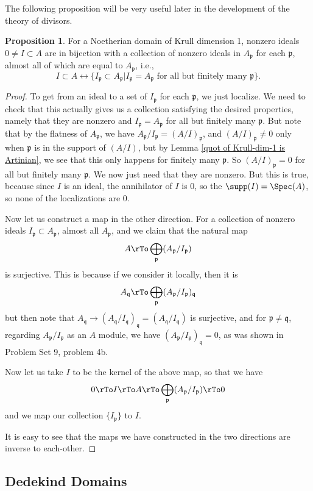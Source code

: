 \documentclass[12 pt]{article}
\theoremstyle{definition}
\newtheorem{propn}[thm]{Proposition}
\renewcommand{\(}{\left(}
\renewcommand{\)}{\right)}
\newcommand\fp{{\mathfrak p}}
\newcommand\fq{{\mathfrak q}}
\begin{document}
The following proposition will be very useful later in the development of the theory of divisors.

\begin{propn} For a Noetherian domain of Krull dimension 1, nonzero ideals $0 \neq I \subset A$ are in bijection with a collection of nonzero ideals in $A_{\fp}$ for each $\fp$, almost all of which are equal to $A_{\fp}$, i.e.,
\[I \subset A \longleftrightarrow \{I_{\fp} \subset A_{\fp} | I_{\fp} =A_{\fp} \text{ for all but finitely many $\fp$}\}.\]
\label{I correspond to I_p}
\end{propn}
\begin{proof} To get from an ideal to a set of $I_{\fp}$ for each $\fp$, we just localize. We need to check that this actually gives us a collection satisfying the desired properties, namely that they are nonzero and $I_{\fp}=A_{\fp}$ for all but finitely many $\fp$. But note that by the flatness of $A_{\fp}$, we have $A_{\fp}/I_{\fp}=(A/I)_{\fp}$, and $(A/I)_{\fp} \neq 0$ only when $\fp$ is in the support of $(A/I)$, but by Lemma \ref{quot of Krull-dim-1 is Artinian}, we see that this only happens for finitely many $\fp$. So $(A/I)_{\fp} =0 $ for all but finitely many $\fp$. We now just need that they are nonzero. But this is true, because since $I$ is an ideal, the annihilator of $I$ is 0, so the $\supp(I)=\Spec(A)$, so none of the localizations are 0.

Now let us construct a map in the other direction. For a collection  of nonzero ideals $I_{\fp} \subset A_{\fp}$, almost all $A_{\fp}$, and we claim that the natural map
\[A \rTo \bigoplus_{\fp}(A_{\fp}/I_{\fp})\]
is surjective.
This is because if we consider it locally, then it is
\[A_{\fq} \rTo \bigoplus_{\fp}(A_{\fp}/I_{\fp})_\fq\]
but then note that $A_{\fq} \to (A_{\fq}/I_{\fq})_{\fq}=(A_{\fq}/I_{\fq})$ is surjective, and for $\fp \neq \fq$, regarding $A_\fp/I_\fp$ as an $A$ module, we have $(A_{\fp}/I_{\fp})_{\fq}=0$, as was shown in Problem Set 9, problem 4b.

Now let us take $I$ to be the kernel of the above map, so that we have
\[0 \rTo I \rTo A \rTo \bigoplus_{\fp}(A_{\fp}/I_{\fp}) \rTo 0\]
and we map our collection $\{I_{\fp}\}$ to $I$.

It is easy to see that the maps we have constructed in the two directions are inverse to each-other.
\end{proof}


\subsection{Dedekind Domains}
\end{document}
